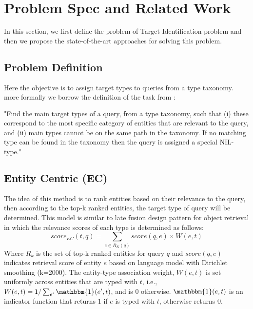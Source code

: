 \section{Problem Spec and Related Work}
In this section, we first define the problem of Target Identification problem and then we propose the state-of-the-art approaches for solving this problem.

\subsection{Problem Definition}
Here the objective is to assign target types to queries from a type taxonomy. more formally we borrow the definition of the task from \cite{Garigliotti:2017:TTI:3077136.3080659}:

"Find the main target types of a query, from a type taxonomy, such that (i) these correspond to the most specific category of entities that are relevant to the query, and (ii) main types cannot be on the same path in the taxonomy. If no matching type can be found in the taxonomy then the query is assigned a special NIL-type."

\subsection{Entity Centric (EC)}\label{EC}
The idea of this method is to rank entities based on their relevance to the query, then according to the top-k ranked entities, the target type of query will be determined. This model is similar to late fusion design pattern for object retrieval \cite{zhang2017design} in which the relevance scores of each type is determined as follows:
\begin{equation}
score_{EC}(t,q) = \sum_{e\in R_K(q)}{score(q,e)\times W(e,t)}
\end{equation}
Where $R_k$ is the set of top-k ranked entities for query $q$ and $score(q,e)$ indicates retrieval score of entity $e$ based on language model with Dirichlet smoothing (k=2000). The entity-type association weight, $W(e,t)$ is set uniformly across entities that are typed with $t$, i.e., $W(e,t)=1/\sum_{e^\prime}{\mathbbm{1}(e^\prime,t)}$, and is 0 otherwise.
$\mathbbm{1}(e,t)$ is an indicator function that returns $1$ if $e$ is typed with $t$, otherwise returns $0$.

